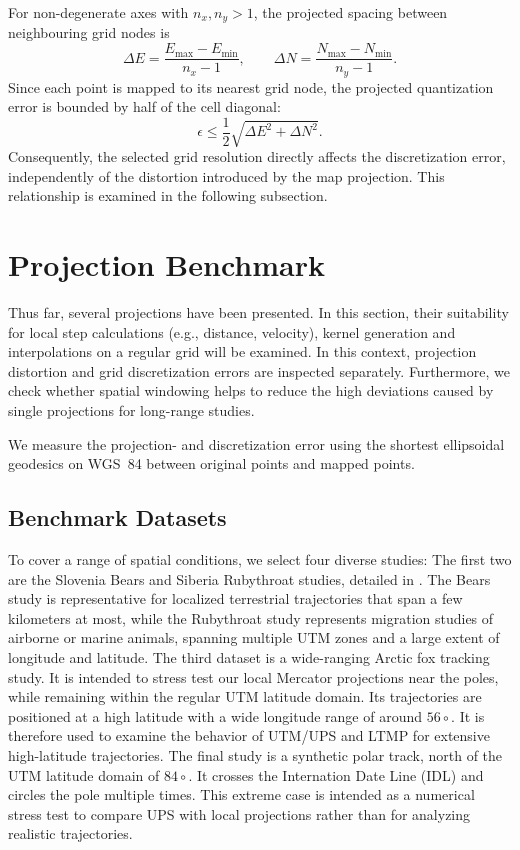 For non-degenerate axes with \(n_x,n_y>1\), the projected spacing between neighbouring grid nodes is
\[
\Delta E
=
\frac{E_{\max}-E_{\min}}{n_x-1},
\qquad
\Delta N
=
\frac{N_{\max}-N_{\min}}{n_y-1}.
\]
Since each point is mapped to its nearest grid node, the projected quantization error is bounded by half of the cell diagonal:
\[
\epsilon
\leq
\frac{1}{2}
\sqrt{\Delta E^2+\Delta N^2}.
\]
Consequently, the selected grid resolution directly affects the discretization error, independently of the distortion introduced by the map projection.
This relationship is examined in the following subsection.


\section{Projection Benchmark}
\label{sec:projection-benchmark}
Thus far, several projections have been presented.
In this section, their suitability for local step calculations (e.g., distance, velocity), kernel generation and interpolations on a regular grid will be examined.
In this context, projection distortion and grid discretization errors are inspected separately.
Furthermore, we check whether spatial windowing helps to reduce the high deviations caused by single projections for long-range studies.

We measure the projection- and discretization error using the shortest ellipsoidal geodesics on WGS~84 between original points and mapped points.

\subsection{Benchmark Datasets}
\label{subsec:projection-benchmark-datasets}
To cover a range of spatial conditions, we select four diverse studies: The first two are the Slovenia Bears and Siberia Rubythroat studies, detailed in .
The Bears study is representative for localized terrestrial trajectories
that span a few kilometers at most, while the Rubythroat study represents migration studies of airborne or marine animals,
spanning multiple UTM zones and a large extent of longitude and latitude.
The third dataset is a wide-ranging Arctic fox tracking study.
It is intended to stress test our local Mercator projections near the poles, while remaining within the regular UTM latitude domain.
Its trajectories are positioned at a high latitude with a wide longitude range of around $56\circ$.
It is therefore used to examine the behavior of UTM/UPS and LTMP for extensive high-latitude trajectories.
The final study is a synthetic polar track, north of the UTM latitude domain of $84\circ$.
It crosses the Internation Date Line (IDL) and circles the pole multiple times.
This extreme case is intended as a numerical stress test to compare UPS with local projections rather than for analyzing realistic trajectories.

